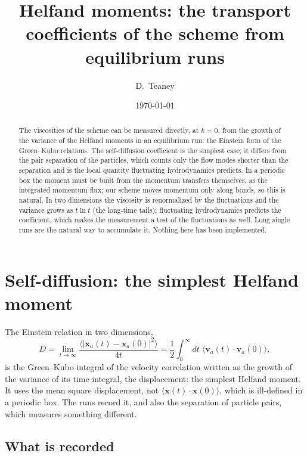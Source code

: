 \documentclass[11pt,aps,preprint,nofootinbib,superscriptaddress,tightenlines]{revtex4-2}
\def\st{\begin{equation}}
\def\stp{\end{equation}}
\newcommand{\avg}[1]{\langle #1\rangle}
\begin{document}
\title{Helfand moments: the transport coefficients of the scheme from equilibrium runs}
\author{D.~Teaney}
\date{\today}

\begin{abstract}
The viscosities of the scheme can be measured directly, at $k=0$, from the growth of the variance of the Helfand moments in an
equilibrium run: the Einstein form of the Green--Kubo relations.  The self-diffusion coefficient is the simplest case; it differs
from the pair separation of the particles, which counts only the flow modes shorter than the separation and is the local quantity
fluctuating hydrodynamics predicts.  In a
periodic box the moment must be built from the momentum transfers themselves, as the integrated momentum flux; our scheme
moves momentum only along bonds, so this is natural.  In two dimensions the viscosity is renormalized by the fluctuations and
the variance grows as $t\ln t$ (the long-time tails); fluctuating hydrodynamics predicts the coefficient, which makes the
measurement a test of the fluctuations as well.  Long single runs are the natural way to accumulate it.  Nothing here has
been implemented.
\end{abstract}

\maketitle

\section{Self-diffusion: the simplest Helfand moment}
\label{sec:diffusion}

The Einstein relation in two dimensions,
\st
D=\lim_{t\to\infty}\frac{\avg{|\bm x_a(t)-\bm x_a(0)|^2}}{4t}=\frac12\int_0^\infty dt\;\avg{\bm v_a(t)\cdot\bm v_a(0)} ,
\label{einstein}
\stp
is the Green--Kubo integral of the velocity correlation written as the growth of the variance of its time integral, the
displacement: the simplest Helfand moment.  It uses the mean square displacement, not $\avg{\bm x(t)\cdot\bm x(0)}$, which is
ill-defined in a periodic box.  The runs record it, and also the separation of particle pairs, which measures something
different.

\subsection{What is recorded}
\label{sec:recorded}
\end{document}
